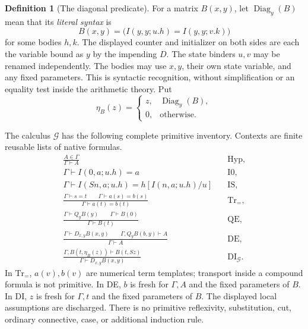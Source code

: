 \documentclass[11pt]{article}
\theoremstyle{definition}
\newtheorem{definition}[theorem]{Definition}
\theoremstyle{remark}
\begin{document}
\begin{definition}[The diagonal predicate]
For a matrix $B(x,y)$, let $\operatorname{Diag}_y(B)$ mean that its
\emph{literal syntax} is
\begin{equation}
 B(x,y)=
 \bigl(I(y,y;u.h)=I(y,y;v.k)\bigr)
 \label{eq:diag-shape}
\end{equation}
for some bodies $h,k$.  The displayed counter and initializer on both sides
are each the variable bound as $y$ by the impending $D$.
The state binders $u,v$ may be renamed independently.  The bodies may use
$x,y$, their own state variable, and any fixed parameters.
This is syntactic recognition, without simplification or an equality test
inside the arithmetic theory.  Put
\[
 \eta_B(z)=
 \begin{cases}
 z,&\operatorname{Diag}_y(B),\\
 0,&\text{otherwise}.
 \end{cases}
\]
\end{definition}

The calculus $\mathcal G$ has the following complete primitive inventory.
Contexts are finite reusable lists of native formulas.
\begin{align*}
 \frac{A\in\Gamma}{\Gamma\vdash A}
   &\quad\text{Hyp},\\[3pt]
 \Gamma\vdash I(0,a;u.h)=a
   &\quad\text{I0},\\[3pt]
 \Gamma\vdash I(Sn,a;u.h)=h[I(n,a;u.h)/u]
   &\quad\text{IS},\\[3pt]
 \frac{\Gamma\vdash s=t\qquad
       \Gamma\vdash a(s)=b(s)}
      {\Gamma\vdash a(t)=b(t)}
   &\quad\text{Tr}_{=},\\[6pt]
 \frac{\Gamma\vdash Q_y B(y)\qquad\Gamma\vdash B(0)}
      {\Gamma\vdash B(t)}
   &\quad\text{QE},\\[6pt]
 \frac{\Gamma\vdash D_{x,y}B(x,y)\qquad
       \Gamma,Q_yB(b,y)\vdash A}
      {\Gamma\vdash A}
   &\quad\text{DE},\\[6pt]
 \frac{\Gamma,B(t,\eta_B(z))\vdash B(t,Sz)}
      {\Gamma\vdash D_{x,y}B(x,y)}
   &\quad\text{DI}_{\mathcal G}.
\end{align*}
In $\mathrm{Tr}_{=}$, $a(v),b(v)$ are numerical term templates; transport
inside a compound formula is not primitive.  In DE, $b$ is fresh for
$\Gamma,A$ and the fixed parameters of $B$.  In DI, $z$ is fresh for
$\Gamma,t$ and the fixed parameters of $B$.  The displayed local
assumptions are discharged.  There is no primitive reflexivity,
substitution, cut, ordinary connective, case, or additional induction
rule.
\end{document}
